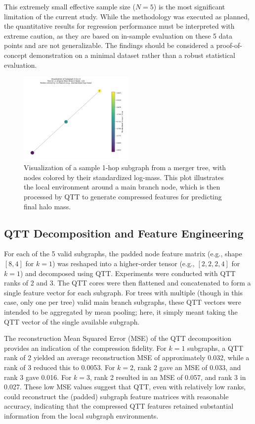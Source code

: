 \documentclass[twocolumn]{aastex631}
\begin{document}
This extremely small effective sample size ($N=5$) is the most significant limitation of the current study. While the methodology was executed as planned, the quantitative results for regression performance must be interpreted with extreme caution, as they are based on in-sample evaluation on these 5 data points and are not generalizable. The findings should be considered a proof-of-concept demonstration on a minimal dataset rather than a robust statistical evaluation.

\begin{figure}[h!]
    \centering
    \includegraphics[width=0.5\textwidth]{../input_files/plots/subgraph_vis_k1_idx0_5_20250524-175501.png}
    \caption{Visualization of a sample 1-hop subgraph from a merger tree, with nodes colored by their standardized log-mass. This plot illustrates the local environment around a main branch node, which is then processed by QTT to generate compressed features for predicting final halo mass.
}
    \label{fig:subgraph_vis}
\end{figure}

\subsection{QTT Decomposition and Feature Engineering}

For each of the 5 valid subgraphs, the padded node feature matrix (e.g., shape $[8, 4]$ for $k=1$) was reshaped into a higher-order tensor (e.g., $[2, 2, 2, 4]$ for $k=1$) and decomposed using QTT. Experiments were conducted with QTT ranks of 2 and 3. The QTT cores were then flattened and concatenated to form a single feature vector for each subgraph. For trees with multiple (though in this case, only one per tree) valid main branch subgraphs, these QTT vectors were intended to be aggregated by mean pooling; here, it simply meant taking the QTT vector of the single available subgraph.

The reconstruction Mean Squared Error (MSE) of the QTT decomposition provides an indication of the compression fidelity. For $k=1$ subgraphs, a QTT rank of 2 yielded an average reconstruction MSE of approximately 0.032, while a rank of 3 reduced this to 0.0053. For $k=2$, rank 2 gave an MSE of 0.033, and rank 3 gave 0.016. For $k=3$, rank 2 resulted in an MSE of 0.057, and rank 3 in 0.027. These low MSE values suggest that QTT, even with relatively low ranks, could reconstruct the (padded) subgraph feature matrices with reasonable accuracy, indicating that the compressed QTT features retained substantial information from the local subgraph environments.
\end{document}
